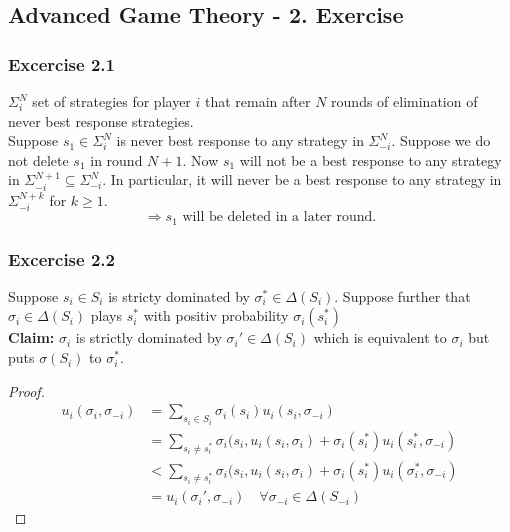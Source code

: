 \documentclass[12pt]{extreport} %
\theoremstyle{named}
\theoremstyle{itshape}
\theoremstyle{normal}
\begin{document}
\subsection*{Advanced Game Theory - 2. Exercise}

\subsubsection*{Excercise 2.1}

$\Sigma_i^N$ set of strategies for player $i$ that remain after $N$ rounds of elimination of never best response strategies. ~\\

Suppose $s_1 \in \Sigma_i^N$ is never best response to any strategy in $\Sigma_{-i}^N$. Suppose we do not delete $s_1$ in round $N+1$. Now $s_1$ will not be a best response to any strategy in $\Sigma_{-i}^{N+1} \subseteq \Sigma_{-i}^{N}$. In particular, it will never be a best response to any strategy in $\Sigma_{-i}^{N+k}$ for $k \geq 1$.
$$ \Rightarrow s_1 \text{ will be deleted in a later round.} $$

\subsubsection*{Excercise 2.2} %

Suppose $s_i \in S_i$ is stricty dominated by $\sigma_i^{*} \in \Delta(S_i)$. Suppose further that $\sigma_i \in \Delta(S_i)$ plays $s_i^{*}$ with positiv probability $\sigma_i(s_i^*)$ ~\\

\textbf{Claim:} $\sigma_i$ is strictly dominated by $\sigma_i' \in \Delta(S_i)$ which is equivalent to $\sigma_i$ but puts $\sigma(S_i)$ to $\sigma_i^*$.

\begin{proof}
	\begin{align*}
		u_i(\sigma_i, \sigma_{-i}) & = \sum_{s_i \in S_i} \sigma_i(s_i) u_i(s_i, \sigma_{-i}) \\
		& = \sum_{s_i \neq s_i^*} \sigma_i(s_i, u_i(s_i, \sigma_i) + \sigma_i(s_i^*) u_i(s_i^*, \sigma_{-i}) \\
		& < \sum_{s_i \neq s_i^*} \sigma_i(s_i, u_i(s_i, \sigma_i) + \sigma_i(s_i^*) u_i(\sigma_i^*, \sigma_{-i}) \\
		& = u_i(\sigma_i', \sigma_{-i}) \quad \forall \sigma_{-i} \in \Delta(S_{-i})
	\end{align*}
\end{proof}
\end{document}

